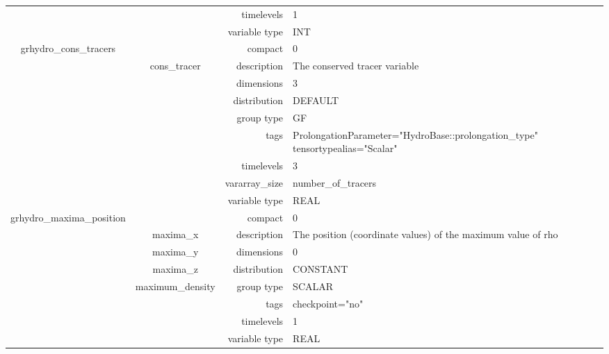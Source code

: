 \documentclass{article}
\begin{document}
\begin{tabular*}{150mm}{|c|c@{\extracolsep{\fill}}|rl|}
 &  & timelevels & 1 \\ 
 &  & variable type & INT \\ 
\hline 
grhydro\_cons\_tracers &  & compact & 0 \\ 
 & cons\_tracer & description & The conserved tracer variable \\ 
 &  & dimensions & 3 \\ 
 &  & distribution & DEFAULT \\ 
 &  & group type & GF \\ 
 &  & tags & ProlongationParameter="HydroBase::prolongation\_type" tensortypealias="Scalar" \\ 
 &  & timelevels & 3 \\ 
 &  & vararray\_size & number\_of\_tracers \\ 
 &  & variable type & REAL \\ 
\hline 
grhydro\_maxima\_position &  & compact & 0 \\ 
 & maxima\_x & description & The position (coordinate values) of the maximum value of rho \\ 
 & maxima\_y & dimensions & 0 \\ 
 & maxima\_z & distribution & CONSTANT \\ 
 & maximum\_density & group type & SCALAR \\ 
 &  & tags & checkpoint="no" \\ 
 &  & timelevels & 1 \\ 
 &  & variable type & REAL \\ 
\hline 
\end{tabular*} 



\vspace{5mm}
\vspace{5mm}
\end{document}
